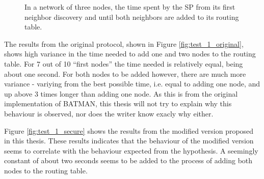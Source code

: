 \begin{figure}[h]
	\centering
	\caption{In a network of three nodes, the time spent by the \ac{SP} from its first neighbor discovery and until both neighbors are added to its routing table.}
	\label{fig:results_test_1}
\end{figure}

The results from the original protocol, shown in Figure
\ref{fig:test_1_original}, shows high variance in the time needed to add one and
two nodes to the routing table. For 7 out of 10 ``first nodes'' the time needed
is relatively equal, being about one second. For both nodes to be added however,
there are much more variance - variying from the best possible time, i.e. equal
to adding one node, and up above 3 times longer than adding one node. As this is
from the original implementation of BATMAN, this thesis will not try to explain
why this behaviour is observed, nor does the writer know exacly why either.

Figure \ref{fig:test_1_secure} shows the results from the modified version
proposed in this thesis. These results indicates that the behaviour of the
modified version seems to correlate with the behaviour expected from the
hypothesis. A seemingly constant of about two seconds seems to be added to the
process of adding both nodes to the routing table. 

